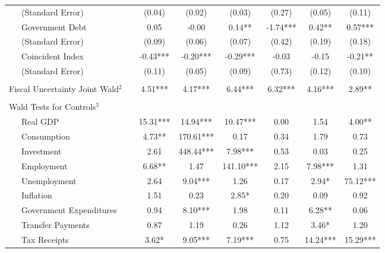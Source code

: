 \begin{table}
{\begin{center}
\begin{tabular}{l|S[table-format=3.2] S[table-format=3.2] S[table-format=3.2] S[table-format=3.2] S[table-format=3.2] S[table-format=3.2]}
~~~(Standard Error) & (0.04) & (0.02) & (0.03) & (0.27) & (0.05) & (0.11) \\ [0.2pc]
~~~Government Debt & 0.05 & -0.00 & 0.14** & -1.74*** & 0.42** & 0.57*** \\
~~~(Standard Error) & (0.09) & (0.06) & (0.07) & (0.42) & (0.19) & (0.18) \\ [0.2pc]
~~~Coincident Index & -0.43*** & -0.20*** & -0.29*** & -0.03 & -0.15 & -0.21** \\
~~~(Standard Error) & (0.11) & (0.05) & (0.09) & (0.73) & (0.12) & (0.10) \\ [0.2pc]
\hline
 &  \\ [-0.25pc]
Fiscal Uncertainty Joint Wald$^2$~~ & 4.51*** & 4.17*** & 6.44*** & 6.32*** & 4.16*** & 2.89** \\ [0.5pc] \hline
 &  \\ [-0.25pc]
Wald Tests for Controls$^3$ &  \\ [0.5pc]
~~~Real GDP & 15.31*** & 14.94*** & 10.47*** & 0.00 & 1.54 & 4.00** \\
~~~Consumption & 4.73** & 170.61*** & 0.17 & 0.34 & 1.79 & 0.73 \\
~~~Investment & 2.61 & 448.44*** & 7.98*** & 0.53 & 0.03 & 0.25 \\
~~~Employment & 6.68** & 1.47 & 141.10*** & 2.15 & 7.98*** & 1.31 \\
~~~Unemployment & 2.64 & 9.04*** & 1.26 & 0.17 & 2.94* & 75.12*** \\
~~~Inflation & 1.51 & 0.23 & 2.85* & 0.20 & 0.09 & 0.92 \\
~~~Government Expenditures & 0.94 & 8.10*** & 1.98 & 0.11 & 6.28** & 0.06 \\
~~~Transfer Payments & 0.87 & 1.19 & 0.26 & 1.12 & 3.46* & 1.20 \\
~~~Tax Receipts & 3.62* & 9.05*** & 7.19*** & 0.75 & 14.24*** & 15.29*** \\



\end{tabular}
\end{center}}
\end{table}
